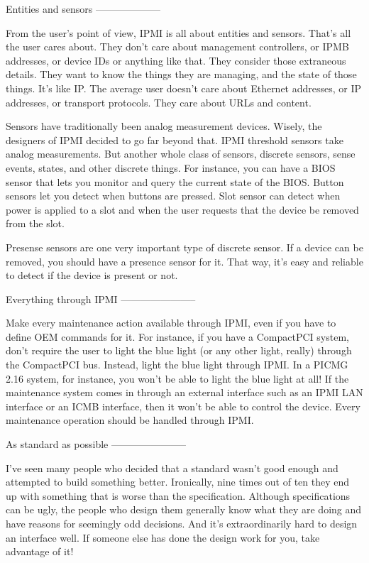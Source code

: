 Entities and sensors
--------------------

From the user's point of view, IPMI is all about entities and sensors.
That's all the user cares about.  They don't care about management
controllers, or IPMB addresses, or device IDs or anything like that.
They consider those extraneous details.  They want to know the things
they are managing, and the state of those things.  It's like IP.  The
average user doesn't care about Ethernet addresses, or IP addresses,
or transport protocols.  They care about URLs and content.

Sensors have traditionally been analog measurement devices.  Wisely,
the designers of IPMI decided to go far beyond that.  IPMI threshold
sensors take analog measurements.  But another whole class of sensors,
discrete sensors, sense events, states, and other discrete things.
For instance, you can have a BIOS sensor that lets you monitor and
query the current state of the BIOS.  Button sensors let you detect
when buttons are pressed.  Slot sensor can detect when power is
applied to a slot and when the user requests that the device be
removed from the slot.

Presense sensors are one very important type of discrete sensor.  If a
device can be removed, you should have a presence sensor for it.  That
way, it's easy and reliable to detect if the device is present or not.


Everything through IPMI
-----------------------

Make every maintenance action available through IPMI, even if you have
to define OEM commands for it.  For instance, if you have a CompactPCI
system, don't require the user to light the blue light (or any other
light, really) through the CompactPCI bus.  Instead, light the blue
light through IPMI.  In a PICMG 2.16 system, for instance, you won't
be able to light the blue light at all!  If the maintenance system
comes in through an external interface such as an IPMI LAN interface
or an ICMB interface, then it won't be able to control the device.
Every maintenance operation should be handled through IPMI.


As standard as possible
-----------------------

I've seen many people who decided that a standard wasn't good enough
and attempted to build something better.  Ironically, nine times out
of ten they end up with something that is worse than the
specification.  Although specifications can be ugly, the people who
design them generally know what they are doing and have reasons for
seemingly odd decisions.  And it's extraordinarily hard to design an
interface well.  If someone else has done the design work for you,
take advantage of it!

